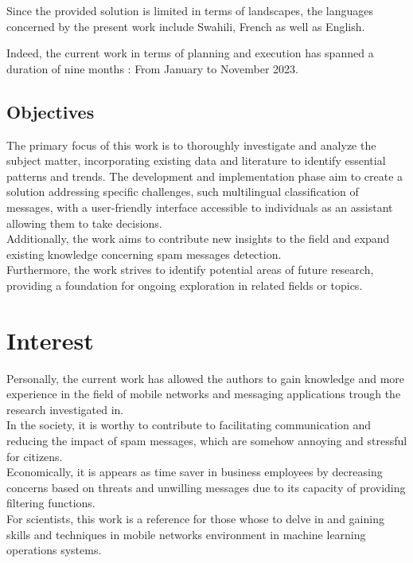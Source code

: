 \documentclass[12pt,a4paper, oneside]{book}
\begin{document}
	Since the provided solution is limited in terms of landscapes, the languages concerned by the present work include Swahili, French as well as English. 
			
	Indeed, the current work in terms of planning and execution has spanned a duration of nine months : From January to November 2023. 
	\subsection{Objectives}
	
	The primary focus of this work is to thoroughly investigate and analyze the subject matter, incorporating existing data and literature to identify essential patterns and trends. The development and implementation phase aim to create a solution addressing specific challenges, such multilingual classification of messages, with a user-friendly interface accessible to individuals as an assistant allowing them to take decisions.\\
	
	Additionally, the work aims to contribute new insights to the field and expand existing knowledge concerning spam messages detection.
	\\
	
	 Furthermore, the work strives to identify potential areas of future research, providing a foundation for ongoing exploration in related fields or topics.
	\section{Interest} 
	Personally, the current work has allowed the authors to gain knowledge and more experience in the field of mobile networks and messaging applications trough the research investigated in. \\
	
	In the society, it is worthy to contribute to facilitating communication and reducing the impact  of spam messages, which are somehow annoying and stressful for citizens.\\
		
	Economically, it is appears as time saver in business employees by decreasing concerns based on threats and unwilling messages due to its capacity of providing filtering functions.\\
				
	For scientists, this work is a reference for those whose to delve in and gaining skills and techniques in mobile networks environment in machine learning operations systems.
	
\end{document}
